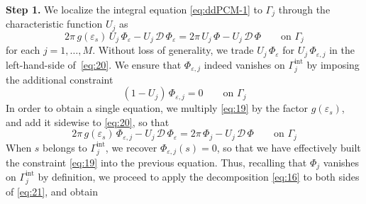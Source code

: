 \documentclass[aip,jcp,a4paper,11pt]{revtex4-1}
\newcommand{\cD}{\mathcal{D}}
\begin{document}
{\bf Step 1.} 
We localize the integral equation \eqref{eq:ddPCM-1} to $\Gamma_j$ through the characteristic function $U_j$ as
\begin{equation}\label{eq:20}
2 \pi \, g(\varepsilon_s) \, U_j \, \Phi_{\varepsilon} - U_j \, {\mathcal{D} \, \Phi}_\varepsilon = 2 \pi \, U_j \, \Phi - U_j \, {\mathcal{D} \, \Phi} \qquad \text{on }\Gamma_j
\end{equation}
for each $j=1,\ldots,M$. 
Without loss of generality, we trade $U_j \, \Phi_\varepsilon$ for $U_j \, \Phi_{\varepsilon,j}$ in the left-hand-side of~\eqref{eq:20}.
We ensure that $\Phi_{\varepsilon,j}$ indeed vanishes on $\Gamma_j^\text{int}$ by imposing the additional constraint
\begin{equation}\label{eq:19}
(1 - U_j) \, \Phi_{\varepsilon,j}  = 0\qquad \text{on }\Gamma_j 
\end{equation}
In order to obtain a single equation, we multiply \eqref{eq:19} by the factor $g(\varepsilon_s)$, and add it sidewise to \eqref{eq:20}, so that
\begin{equation}\label{eq:21}
2 \pi \, g(\varepsilon_s) \, \Phi_{\varepsilon,j} - U_j \, {\mathcal{D} \, \Phi}_\varepsilon = 2 \pi \, \Phi_j - U_j \, {\mathcal{D} \, \Phi} \qquad \text{on }\Gamma_j
\end{equation}
When $s$ belongs to $\Gamma_j^\text{int}$, we recover $\Phi_{\varepsilon,j}(s) = 0$, so that we have effectively built the constraint \eqref{eq:19} into the previous equation. Thus, recalling that $\Phi_j$ vanishes on $\Gamma_j^\text{int}$ by definition, we proceed to apply the decomposition \eqref{eq:16} to both sides of \eqref{eq:21}, and obtain
\end{document}
